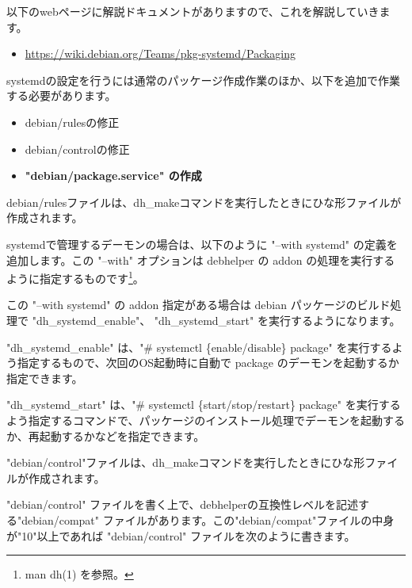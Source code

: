\documentclass[mingoth,a4paper]{jsarticle}
\begin{document}
以下のwebページに解説ドキュメントがありますので、これを解説していきます。

\begin{itemize}
\item \url{https://wiki.debian.org/Teams/pkg-systemd/Packaging}
\end{itemize}


systemdの設定を行うには通常のパッケージ作成作業のほか、以下を追加で作業する必要があります。

\begin{itemize}
\item debian/rulesの修正
\item debian/controlの修正
\item \bf{"debian/package.service"} の作成
\end{itemize}



debian/rulesファイルは、dh\_makeコマンドを実行したときにひな形ファイルが作成されます。


systemdで管理するデーモンの場合は、以下のように "--with systemd" の定義を追加します。この "--with" オプションは debhelper の addon の処理を実行するように指定するものです\footnote{man dh(1) を参照。}。



この "--with systemd" の addon 指定がある場合は debian パッケージのビルド処理で "dh\_systemd\_enable"、 "dh\_systemd\_start" を実行するようになります。


"dh\_systemd\_enable" は、"\# systemctl \{enable/disable\} package" を実行するよう指定するもので、次回のOS起動時に自動で package のデーモンを起動するか指定できます。


"dh\_systemd\_start" は、"\# systemctl \{start/stop/restart\} package" を実行するよう指定するコマンドで、パッケージのインストール処理でデーモンを起動するか、再起動するかなどを指定できます。



"debian/control"ファイルは、dh\_makeコマンドを実行したときにひな形ファイルが作成されます。


"debian/control" ファイルを書く上で、debhelperの互換性レベルを記述する"debian/compat" ファイルがあります。この"debian/compat"ファイルの中身が"10"以上であれば "debian/control" ファイルを次のように書きます。
\end{document}
